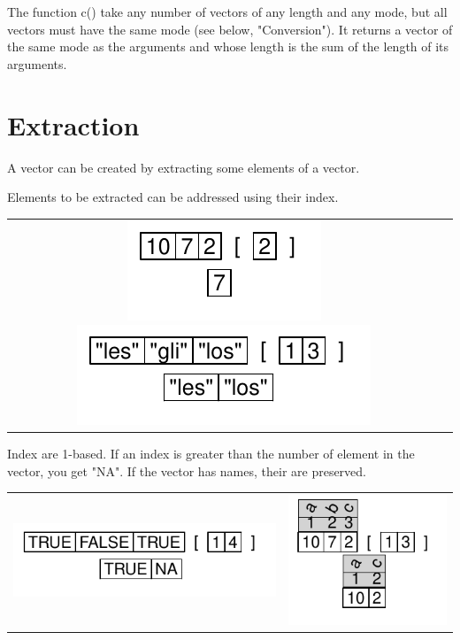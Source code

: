 \documentclass[pdflatex]{article}
\begin{document}
The function c() take any number of vectors of any length and any mode, but all vectors must have the same mode (see below, "Conversion"). It returns a vector of the same mode as the arguments and whose length is the sum of the length of its arguments.

\section{Extraction}

A vector can be created by extracting some elements of a vector.

Elements to be extracted can be addressed using their index.

\begin{tabular}{cc}
\includegraphics{extract_num} 
\includegraphics{extract_nums} 
\end{tabular}

Index are 1-based. If an index is greater than the number of element in the vector, you get "NA". If the vector has names, their are preserved.

\begin{tabular}{cc}
\includegraphics{extract_nums_outsider} & \includegraphics{extract_nums_names}
\end{tabular}
\end{document}
